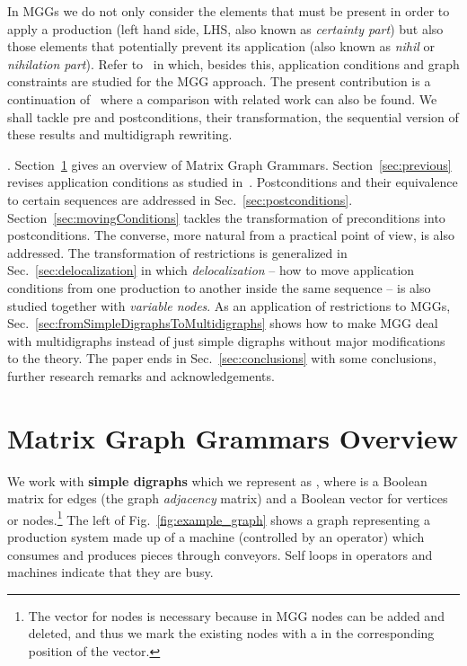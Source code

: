 \documentclass{fundam}
\begin{document}
In MGGs we do not only consider the elements that must be present in
order to apply a production (left hand side, LHS, also known as
\emph{certainty part}) but also those elements that potentially
prevent its application (also known as \emph{nihil} or
\emph{nihilation part}). Refer to~\cite{MGGfundamenta} in which,
besides this, application conditions and graph constraints are studied
for the MGG approach. The present contribution is a continuation
of~\cite{MGGfundamenta} where a comparison with related work can also be
found. We shall tackle pre and postconditions, their transformation,
the sequential version of these results and multidigraph rewriting.

. Section~\ref{sec:MGGs} gives an
overview of Matrix Graph Grammars. Section~\ref{sec:previous} revises
application conditions as studied
in~\cite{MGGfundamenta}. Postconditions and their equivalence to
certain sequences are addressed in
Sec.~\ref{sec:postconditions}. Section~\ref{sec:movingConditions}
tackles the transformation of preconditions into postconditions. The
converse, more natural from a practical point of view, is also
addressed. The transformation of restrictions is generalized in
Sec.~\ref{sec:delocalization} in which \emph{delocalization} -- how to
move application conditions from one production to another inside the
same sequence -- is also studied together with \emph{variable
  nodes}. As an application of restrictions to MGGs,
Sec.~\ref{sec:fromSimpleDigraphsToMultidigraphs} shows how to make MGG
deal with multidigraphs instead of just simple digraphs without major
modifications to the theory. The paper ends in
Sec.~\ref{sec:conclusions} with some conclusions, further research
remarks and acknowledgements.

\section{Matrix Graph Grammars Overview}
\label{sec:MGGs}


We work with \textbf{simple digraphs} which we represent as , where  is a Boolean matrix for edges (the graph {\em
  adjacency} matrix) and  a Boolean vector for vertices or
nodes.\footnote{The vector for nodes is necessary because in MGG nodes
  can be added and deleted, and thus we mark the existing nodes with a
   in the corresponding position of the vector.} The left of
Fig.~\ref{fig:example_graph} shows a graph representing a production
system made up of a machine (controlled by an operator) which consumes
and produces pieces through conveyors. Self loops in operators and
machines indicate that they are busy.
\end{document}
